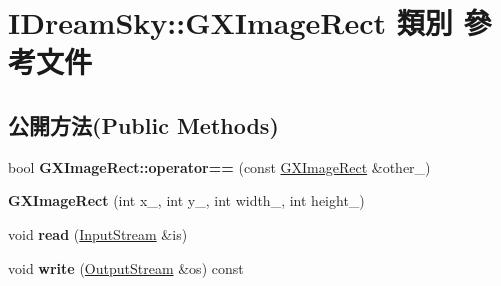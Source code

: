 \hypertarget{class_i_dream_sky_1_1_g_x_image_rect}{}\section{I\+Dream\+Sky\+:\+:G\+X\+Image\+Rect 類別 參考文件}
\label{class_i_dream_sky_1_1_g_x_image_rect}
\subsection*{公開方法(Public Methods)}
\begin{DoxyCompactItemize}
\item 
bool {\bfseries G\+X\+Image\+Rect\+::operator==} (const \hyperlink{class_i_dream_sky_1_1_g_x_image_rect}{G\+X\+Image\+Rect} \&other\+\_\+)\hypertarget{class_i_dream_sky_1_1_g_x_image_rect_ab6457958974b81325d37b4cad1846221}{}\label{class_i_dream_sky_1_1_g_x_image_rect_ab6457958974b81325d37b4cad1846221}

\item 
{\bfseries G\+X\+Image\+Rect} (int x\+\_\+, int y\+\_\+, int width\+\_\+, int height\+\_\+)\hypertarget{class_i_dream_sky_1_1_g_x_image_rect_ab07a6f6b9f7b1e462abfff2c4b096c43}{}\label{class_i_dream_sky_1_1_g_x_image_rect_ab07a6f6b9f7b1e462abfff2c4b096c43}

\item 
void {\bfseries read} (\hyperlink{class_i_dream_sky_1_1_input_stream}{Input\+Stream} \&is)\hypertarget{class_i_dream_sky_1_1_g_x_image_rect_a562ceae35144bcbd30ec95f6c7ce0422}{}\label{class_i_dream_sky_1_1_g_x_image_rect_a562ceae35144bcbd30ec95f6c7ce0422}

\item 
void {\bfseries write} (\hyperlink{class_i_dream_sky_1_1_output_stream}{Output\+Stream} \&os) const \hypertarget{class_i_dream_sky_1_1_g_x_image_rect_aa715b2882a7e3c847318d2137abf071d}{}\label{class_i_dream_sky_1_1_g_x_image_rect_aa715b2882a7e3c847318d2137abf071d}

\end{DoxyCompactItemize}
